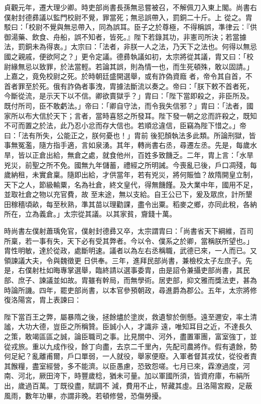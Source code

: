 \begin{pinyinscope}
 貞觀元年，遷大理少卿。時吏部尚書長孫無忌嘗被召，不解佩刀入東上閣。尚書右僕射封德彞議以監門校尉不覺，罪當死；無忌誤帶入，罰銅二十斤。上
 從之。胄駁曰：「校尉不覺與無忌帶入，同為誤耳。臣子之於尊極，不得稱誤，準律云：『供御湯藥、飲食、舟船，誤不知者，皆死。』陛下若錄其功，非憲司所決；若當據法，罰銅未為得衷。」太宗曰：「法者，非朕一人之法，乃天下之法也。何得以無忌國之親戚，便欲阿之？」更令定議。德彞執議如初，太宗將從其議，胄又曰：「校尉緣無忌以致罪，於法當輕。若論其誤，則為情一也，而生死頓殊，敢以固請。」上嘉之，竟免校尉之死。於時朝廷盛開選舉，或有詐偽資廕
 者，帝令其自首，不首者罪至於死。俄有詐偽者事洩，胄據法斷流以奏之。帝曰：「朕下敕不首者死，今斷從流，是示天下以不信。卿欲賣獄乎？」胄曰：「陛下當即殺之，非臣所及。既付所司，臣不敢虧法。」帝曰：「卿自守法，而令我失信邪？」胄曰：「法者，國家所以布大信於天下；言者，當時喜怒之所發耳。陛下發一朝之忿而許殺之，既知不可而置之於法，此乃忍小忿而存大信也。若順忿違信，臣竊為陛下惜之。」帝曰：「法有所失，公能正之，朕何憂也！」胄前
 後犯顏執法多此類。所論刑獄，皆事無冤濫，隨方指手適，言如泉湧。其年，轉尚書右丞，尋遷左丞。先是，每歲水旱，皆以正倉出給，無倉之處，就食他州，百姓多致饑乏。二年，胄上言：「水旱兇災，前聖之所不免。國無九年儲蓄，禮經之所明誡。今喪亂已後，戶口凋殘，每歲納租，未實倉稟。隨即出給，才供當年，若有兇災，將何賑恤？故隋開皇立制，天下之人，節級輸粟，名為社倉，終文皇代，得無饑饉。及大業中年，國用不足，並取社倉之物以充官費，故
 至末途，無以支給。自王公已下，爰及眾庶，計所墾田稼穡頃畝，每至秋熟，準其苗以理勸課，盡令出粟。稻麥之鄉，亦同此稅，各納所在，立為義倉。」太宗從其議。以其家貧，齎錢十萬。



 時尚書左僕射蕭瑀免官，僕射封德彞又卒，太宗謂胄曰：「尚書省天下綱維，百司所稟，若一事有失，天下必有受其弊者。今以令、僕系之於卿，當稱朕所望也。」胄性明敏，達於從政，處斷明速。議者以為左右丞稱職，武德已來，一人而已。又領諫議大夫，令與魏徵更
 日供奉。三年，進拜民部尚書，兼檢校太子左庶子。先是，右僕射杜如晦專掌選舉，臨終請以選事委胄，由是詔令兼攝吏部尚書，其民部、庶子、諫議並如故。胄雖有幹局，而無學術。居吏部，抑文雅而獎法吏，甚為時論所譏。四年，罷吏部尚書，以本官參預朝政，尋進爵為郡公。五年，太宗將修復洛陽宮，胄上表諫曰：



 陛下當百王之弊，屬暴隋之後，拯餘燼於塗炭，救遺黎於倒懸。遠至邇安，率土清謐，大功大德，豈臣之所稱贊。臣誠小人，才識非
 遠，唯知耳目之近，不達長久之策，敢竭區區之誠，論臣職司之事。比見關中、河外，盡置軍團，富室強丁，並從戎旅。重以九成作役，餘丁向盡，去京二千里內，先配司農將作。假有遺餘，勢何足紀？亂離甫爾，戶口單弱，一人就役，舉家便廢。入軍者督其戎仗，從役者責其餱糧，盡室經營，多不能濟。以臣愚慮，恐致怨嗟。七月已來，霖潦過度，河南、河北，厥田洿下，時豐歲稔，猶未可量。加以軍國所須，皆資府庫，布絹所出，歲過百萬。丁既役盡，賦調不
 減，費用不止，帑藏其虛。且洛陽宮殿，足蔽風雨，數年功畢，亦謂非晚。若頓修營，恐傷勞擾。




\end{pinyinscope}

